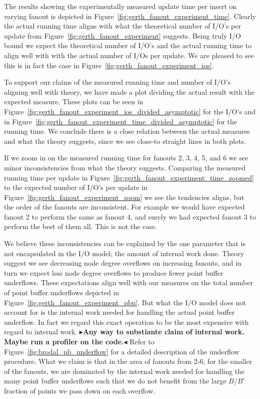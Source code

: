 \documentclass[twoside,11pt,openright]{report}
\def \epsilon {\varepsilon}
\newcommand{\todo}[1]{{\color[rgb]{.5,0,0}\textbf{$\blacktriangleright$#1$\blacktriangleleft$}}}
\begin{document}
The results showing the experimentally measured update time per insert on varying fanout is depicted in Figure~\ref{fig:gerth_fanout_experiment_time}. Clearly the actual running time aligns with what the theoretical number of I/O's per update from Figure~\ref{fig:gerth_fanout_experiment} suggests. Being truly I/O bound we expect the theoretical number of I/O's and the actual running time to align well with with the actual number of I/Os per update. We are pleased to see this is in fact the case in Figure~\ref{fig:gerth_fanout_experiment_ios}.

To support our claims of the measured running time and number of I/O's aligning well with theory, we have made a plot dividing the actual result with the expected measure. These plots can be seen in Figure~\ref{fig:gerth_fanout_experiment_ios_divided_asymptotic} for the I/O's and in Figure~\ref{fig:gerth_fanout_experiment_time_divided_asymptotic} for the running time. We conclude there is a close relation between the actual measures and what the theory suggests, since we see close-to straight lines in both plots.

If we zoom in on the measured running time for fanouts 2, 3, 4, 5, and 6 we see minor inconsistencies from what the theory suggests. Comparing the measured running time per update in Figure~\ref{fig:gerth_fanout_experiment_time_zoomed} to the expected number of I/O's per update in Figure~\ref{fig:gerth_fanout_experiment_zoom} we see the tendencies aligns, but the order of the fanouts are inconsistent. For example we would have expected fanout 2 to perform the same as fanout 4, and surely we had expected fanout 3 to perform the best of them all. This is not the case.

We believe these inconsistencies can be explained by the one parameter that is not encapsulated in the I/O model; the amount of internal work done. Theory suggest we see decreasing node degree overflows on increasing fanouts, and in turn we expect less node degree overflows to produce fewer point buffer underflows. These expectations align well with our measures on the total number of point buffer underflows depicted in Figure~\ref{fig:gerth_fanout_experiment_pbu}. But what the I/O model does not account for is the internal work needed for handling the actual point buffer underflow. In fact we regard this exact operation to be the most expensive with regard to internal work. \todo{Any way to substiante claim of internal work. Maybe run a profiler on the code.} Refer to Figure~\ref{fig:brodal_pb_underflow} for a detailed description of the underflow procedure. What we claim is that in the area of fanouts from 2-6, for the smaller of the fanouts, we are dominated by the internal work needed for handling the many point buffer underflows such that we do not benefit from the large $B / B^\epsilon$ fraction of points we pass down on each overflow.
\end{document}
